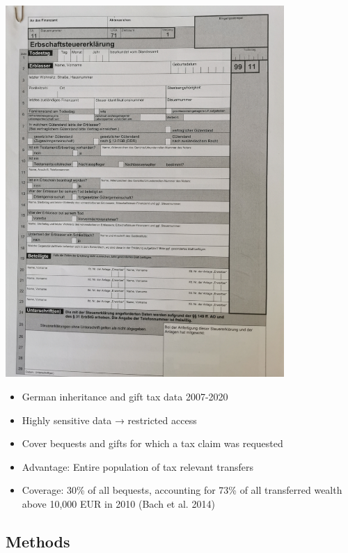 \documentclass[
  letterpaper,
  DIV=11,
  numbers=noendperiod]{scrartcl}
\providecommand{\tightlist}{%
  \setlength{\itemsep}{0pt}\setlength{\parskip}{0pt}}\usepackage{longtable,booktabs,array}
\begin{document}
\includegraphics[width=4.16667in,height=\textheight]{images/steuererkl.jpg}

\begin{itemize}
\tightlist
\item
  German inheritance and gift tax data 2007-2020
\item
  Highly sensitive data → restricted access
\item
  Cover bequests and gifts for which a tax claim was requested
\item
  Advantage: Entire population of tax relevant transfers
\item
  Coverage: 30\% of all bequests, accounting for 73\% of all transferred
  wealth above 10,000 EUR in 2010 (Bach et al. 2014)
\end{itemize}

\hypertarget{methods}{%
\subsection{Methods}\label{methods}}
\end{document}
